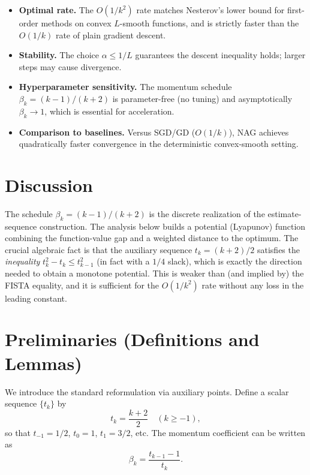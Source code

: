 \documentclass{article}
\begin{document}
\begin{itemize}
\item \textbf{Optimal rate.} The $O(1/k^2)$ rate matches Nesterov's lower bound
      for first-order methods on convex $L$-smooth functions, and is strictly
      faster than the $O(1/k)$ rate of plain gradient descent.
\item \textbf{Stability.} The choice $\alpha \le 1/L$ guarantees the descent
      inequality holds; larger steps may cause divergence.
\item \textbf{Hyperparameter sensitivity.} The momentum schedule
      $\beta_k = (k-1)/(k+2)$ is parameter-free (no tuning) and asymptotically
      $\beta_k \to 1$, which is essential for acceleration.
\item \textbf{Comparison to baselines.} Versus SGD/GD ($O(1/k)$), NAG achieves
      quadratically faster convergence in the deterministic convex-smooth setting.
\end{itemize}

\section*{Discussion}

The schedule $\beta_k = (k-1)/(k+2)$ is the discrete realization of the
estimate-sequence construction. The analysis below builds a potential
(Lyapunov) function combining the function-value gap and a weighted distance to
the optimum. The crucial algebraic fact is that the auxiliary sequence
$t_k = (k+2)/2$ satisfies the \emph{inequality} $t_k^2 - t_k \le t_{k-1}^2$
(in fact with a $1/4$ slack), which is exactly the direction needed to obtain a
monotone potential. This is weaker than (and implied by) the FISTA equality, and
it is sufficient for the $O(1/k^2)$ rate without any loss in the leading
constant.

\section*{Preliminaries (Definitions and Lemmas)}

We introduce the standard reformulation via auxiliary points. Define a scalar
sequence $\{t_k\}$ by
\begin{equation}
t_k = \frac{k+2}{2} \quad (k \ge -1), \label{eq:tk}
\end{equation}
so that $t_{-1} = 1/2$, $t_0 = 1$, $t_1 = 3/2$, etc. The momentum coefficient
can be written as
\begin{equation}
\beta_k = \frac{t_{k-1}-1}{t_k}. \label{eq:betatk}
\end{equation}
\end{document}
